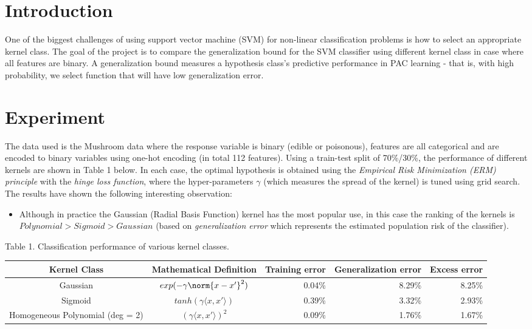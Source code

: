 \documentclass{article}
\begin{document}


\section{Introduction} 
One of the biggest challenges of using support vector machine (SVM) for non-linear classification problems is how to select an appropriate kernel class. The goal of the project is to compare the generalization bound for the SVM classifier using different kernel class in case where all features are binary. A generalization bound measures a hypothesis class's predictive performance in PAC learning - that is, with high probability, we select function that will have low generalization error. 

\section{Experiment} 
The data used is the Mushroom data where the response variable is binary (edible or poisonous), features are all categorical and are encoded to binary variables using one-hot encoding (in total 112 features). Using a train-test split of 70\%/30\%, the performance of different kernels are shown in Table 1 below. In each case, the optimal hypothesis is obtained using the \textit{Empirical Risk Minimization (ERM) principle} with the \textit{hinge loss function}, where the hyper-parameters $\gamma$ (which measures the spread of the kernel) is tuned using grid search. The results have shown the following interesting observation: 

\begin{itemize}
  \item Although in practice the Gaussian (Radial Basis Function) kernel has the most popular use, in this case the ranking of the kernels is $Polynomial > Sigmoid > Gaussian$ (based on \textit{generalization error} which represents the estimated population risk of the classifier). 
\end{itemize}

Table 1. Classification performance of various kernel classes. \\
\begin{tabular}{|c|c|r|r|r|}
\hline
Kernel Class & Mathematical Definition & Training error  & Generalization error & Excess error \\ \hline

Gaussian &	$exp(-\gamma \norm{x-x'}^2)$ & 0.04\% & 8.29\% & 8.25\% \\ \hline

Sigmoid &	$tanh(\gamma \langle x,x' \rangle)$ & 0.39\% & 3.32\% & 2.93\% \\ \hline

Homogeneous Polynomial (deg = 2) &	$(\gamma \langle x,x' \rangle)^2$ & 0.09\% & 1.76\% & 1.67\% \\ \hline

\end{tabular}
\end{document}
